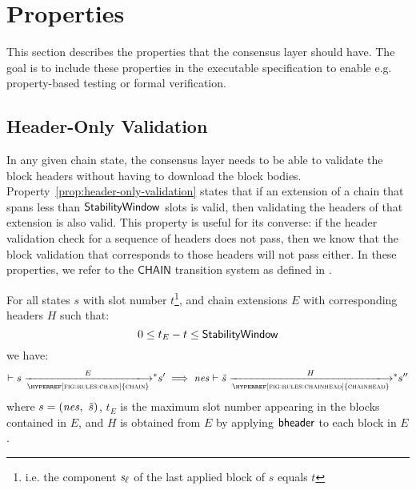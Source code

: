 \newcommand{\Val}{\fun{Val}}
\newcommand{\POV}[1]{\ensuremath{\mathsf{PresOfVal}(\mathsf{#1})}}
\newcommand{\DBE}[2]{\ensuremath{\mathsf{DBE}({#1},~{#2})}}
\newcommand{\DGO}[2]{\ensuremath{\mathsf{DGO}({#1},~{#2})}}
\newcommand{\transtar}[2]{\xlongrightarrow[\textsc{#1}]{#2}\negthickspace^{*}}

\section{Properties}
\label{sec:properties}

This section describes the properties that the consensus layer should have.
The goal is to include these properties in the executable specification
to enable e.g. property-based testing or formal verification.

\subsection{Header-Only Validation}
\label{sec:header-only-validation}
In any given chain state, the consensus layer needs to be able to validate the
block headers without having to download the block bodies.
Property~\ref{prop:header-only-validation} states that if an extension of a
chain that spans less than $\mathsf{StabilityWindow}$ slots is valid, then validating the
headers of that extension is also valid. This property is useful for its
converse: if the header validation check for a sequence of headers does not
pass, then we know that the block validation that corresponds to those headers
will not pass either. In these properties, we refer to the $\mathsf{CHAIN}$
transition system as defined in \cite{shelley_chain_spec}.

\begin{property}\label{prop:header-only-validation}
  For all states $s$ with slot number $t$\footnote{i.e. the
    component $\mathit{s_\ell}$ of the last applied block of $s$ equals $t$},
    and chain extensions $E$ with corresponding headers $H$ such that:
  $$
  0 \leq t_E - t  \leq \mathsf{StabilityWindow}
  $$
  we have:
  $$
  \vdash s \transtar{\hyperref[fig:rules:chain]{chain}}{E} s'
  \implies
  \var{nes} \vdash \tilde{s} \transtar{\hyperref[fig:rules:chainhead]{chainhead}}{H} s''
  $$
  where $s=(\mathit{nes},~\tilde{s})$,
  $t_E$ is the maximum slot number appearing in the blocks contained in
  $E$, and $H$ is obtained from $E$ by applying $\mathsf{bheader}$ to each block in $E$.
\end{property}

